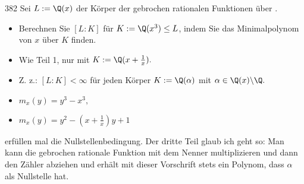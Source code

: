 \begin{algebraUE}{382}
  Sei $L := \Q(x)$ der Körper der gebrochen rationalen Funktionen über \Q.
  \begin{itemize}
      \item Berechnen Sie $[L:K]$ für $K:= \Q(x^3) \leq L$, indem Sie das Minimalpolynom von $x$ über $K$ finden.
      \item Wie Teil 1, nur mit $K := \Q(x+\frac{1}{x}).$
      \item Z. z.: $[L:K] < \infty$ für jeden Körper $K := \Q(\alpha)$ mit $\alpha \in \Q(x) \backslash \Q.$
  \end{itemize}
\end{algebraUE}

\begin{solution}
  \begin{itemize}
      \item $m_x(y) = y^3 - x^3,$
      \item $m_x(y) = y^2 - (x + \frac{1}{x})y + 1$
  \end{itemize}
  erfüllen mal die Nullstellenbedingung. Der dritte Teil glaub ich geht so: Man kann die gebrochen rationale Funktion mit dem Nenner multiplizieren und dann den Zähler abziehen und erhält mit dieser Vorschrift stets ein Polynom, dass $\alpha$ als Nullstelle hat.
\end{solution}
